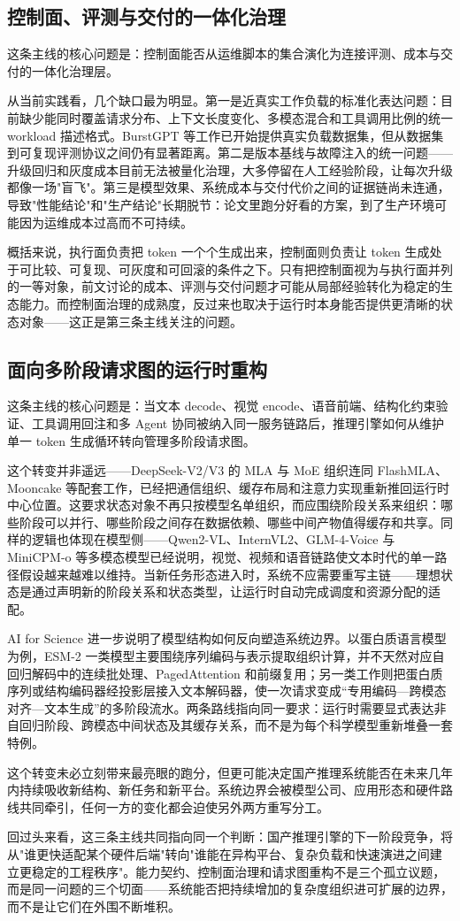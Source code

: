 \subsection{控制面、评测与交付的一体化治理}

这条主线的核心问题是：控制面能否从运维脚本的集合演化为连接评测、成本与交付的一体化治理层。

从当前实践看，几个缺口最为明显。第一是近真实工作负载的标准化表达问题：目前缺少能同时覆盖请求分布、上下文长度变化、多模态混合和工具调用比例的统一 workload 描述格式。BurstGPT 等工作已开始提供真实负载数据集\citep{wang2025burstgpt}，但从数据集到可复现评测协议之间仍有显著距离。第二是版本基线与故障注入的统一问题——升级回归和灰度成本目前无法被量化治理，大多停留在人工经验阶段，让每次升级都像一场"盲飞"。第三是模型效果、系统成本与交付代价之间的证据链尚未连通，导致"性能结论"和"生产结论"长期脱节：论文里跑分好看的方案，到了生产环境可能因为运维成本过高而不可持续。

概括来说，执行面负责把 token 一个个生成出来，控制面则负责让 token 生成处于可比较、可复现、可灰度和可回滚的条件之下。只有把控制面视为与执行面并列的一等对象，前文讨论的成本、评测与交付问题才可能从局部经验转化为稳定的生态能力。而控制面治理的成熟度，反过来也取决于运行时本身能否提供更清晰的状态对象——这正是第三条主线关注的问题。

\subsection{面向多阶段请求图的运行时重构}

这条主线的核心问题是：当文本 decode、视觉 encode、语音前端、结构化约束验证、工具调用回注和多 Agent 协同被纳入同一服务链路后，推理引擎如何从维护单一 token 生成循环转向管理多阶段请求图。

这个转变并非遥远——DeepSeek-V2/V3 的 MLA 与 MoE 组织连同 FlashMLA、Mooncake 等配套工作，已经把通信组织、缓存布局和注意力实现重新推回运行时中心位置\citep{liu2024deepseekv2,deepseekv3,deepseekflashmla,qin2024mooncake}。这要求状态对象不再只按模型名单组织，而应围绕阶段关系来组织：哪些阶段可以并行、哪些阶段之间存在数据依赖、哪些中间产物值得缓存和共享。同样的逻辑也体现在模型侧——Qwen2-VL、InternVL2、GLM-4-Voice 与 MiniCPM-o 等多模态模型已经说明，视觉、视频和语音链路使文本时代的单一路径假设越来越难以维持\citep{wang2024qwen2vl,chen2024internvl2,zeng2024glm4voice,cui2026minicpmo45}。当新任务形态进入时，系统不应需要重写主链——理想状态是通过声明新的阶段关系和状态类型，让运行时自动完成调度和资源分配的适配。

AI for Science 进一步说明了模型结构如何反向塑造系统边界。以蛋白质语言模型为例，ESM-2 一类模型主要围绕序列编码与表示提取组织计算，并不天然对应自回归解码中的连续批处理、PagedAttention 和前缀复用\citep{lin2023esmfold}；另一类工作则把蛋白质序列或结构编码器经投影层接入文本解码器，使一次请求变成“专用编码—跨模态对齐—文本生成”的多阶段流水\citep{liu2024evollama}。两条路线指向同一要求：运行时需要显式表达非自回归阶段、跨模态中间状态及其缓存关系，而不是为每个科学模型重新堆叠一套特例。

这个转变未必立刻带来最亮眼的跑分，但更可能决定国产推理系统能否在未来几年内持续吸收新结构、新任务和新平台。系统边界会被模型公司、应用形态和硬件路线共同牵引，任何一方的变化都会迫使另外两方重写分工。

回过头来看，这三条主线共同指向同一个判断：国产推理引擎的下一阶段竞争，将从"谁更快适配某个硬件后端"转向"谁能在异构平台、复杂负载和快速演进之间建立更稳定的工程秩序"。能力契约、控制面治理和请求图重构不是三个孤立议题，而是同一问题的三个切面——系统能否把持续增加的复杂度组织进可扩展的边界，而不是让它们在外围不断堆积。
